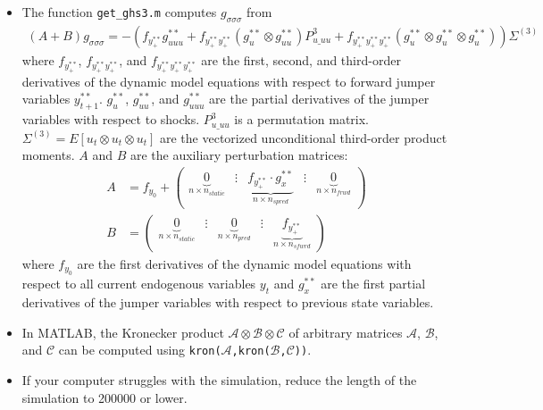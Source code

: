 \documentclass{article}
\begin{document}
\begin{itemize}
\item
The function \texttt{get\_ghs3.m} computes \(g_{\sigma\sigma\sigma}\) from
\begin{align*}
(A+B) g_{\sigma\sigma\sigma} = -\left( f_{y^{**}_{+}} g^{**}_{uuu} + f_{y^{**}_{+}y^{**}_{+}} (g^{**}_u \otimes g^{**}_{uu})P^3_{u\_uu} + f_{y^{**}_{+}y^{**}_{+}y^{**}_{+}} (g^{**}_u \otimes g^{**}_u \otimes g^{**}_u)\right)\Sigma^{(3)} \label{eq:gsss}
\end{align*}
where \(f_{y^{**}_{+}}\), \(f_{y^{**}_{+}y^{**}_{+}}\), and \(f_{y^{**}_{+}y^{**}_{+}y^{**}_{+}}\) are the first, second, and third-order derivatives of the dynamic model equations with respect to forward jumper variables \(y_{t+1}^{**}\).
\(g^{**}_u\), \(g^{**}_{uu}\), and \(g^{**}_{uuu}\) are the partial derivatives of the jumper variables with respect to shocks.
\(P^3_{u\_uu}\) is a permutation matrix.
\(\Sigma^{(3)} = E[u_t \otimes u_t \otimes u_t]\) are the vectorized unconditional third-order product moments.
\(A\) and \(B\) are the auxiliary perturbation matrices:
\begin{align*}
A & = f_{y_0} + \begin{pmatrix} \underbrace{0}_{n\times n_{static}} &\vdots& \underbrace{f_{y^{**}_{+}} \cdot g^{**}_{x}}_{n \times n_{spred}} &\vdots& \underbrace{0}_{n\times n_{frwd}}  \end{pmatrix}\\
B & = \begin{pmatrix} \underbrace{0}_{n \times n_{static}}&\vdots & \underbrace{0}_{n \times n_{pred}} & \vdots & \underbrace{f_{y^{**}_{+}}}_{n \times n_{sfwrd}} \end{pmatrix}
\end{align*}
where \(f_{y_{0}}\) are the first derivatives of the dynamic model equations with respect to all current endogenous variables \(y_{t}^{}\)
and \(g^{**}_{x}\) are the first partial derivatives of the jumper variables with respect to previous state variables.

\item
In MATLAB, the Kronecker product \(\mathcal{A} \otimes \mathcal{B} \otimes \mathcal{C}\) of arbitrary matrices \(\mathcal{A}\), \(\mathcal{B}\), and \(\mathcal{C}\)
  can be computed using \texttt{kron{(\(\mathcal{A}\),kron{(\(\mathcal{B}\),\(\mathcal{C}\))})}}.

\item
If your computer struggles with the simulation, reduce the length of the simulation to 200000 or lower.
\end{itemize}
\end{document}
